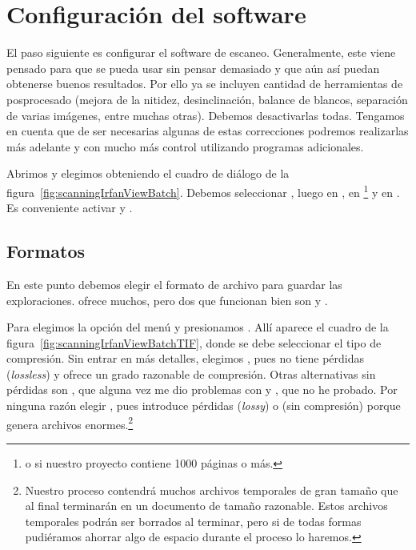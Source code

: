 \documentclass[%
	a5paper,
	10pt,
	twoside,
	openright,
	final,
]{memoir}
\begin{document}
{	\section{Configuración del software\label{sec:scanningSoftware}} El paso siguiente es configurar el software de escaneo. Generalmente, este viene pensado para que se pueda usar sin pensar demasiado y que aún así puedan obtenerse buenos resultados. Por ello ya se incluyen cantidad de herramientas de posprocesado (mejora de la nitidez, desinclinación, balance de blancos, separación de varias imágenes, entre muchas otras). Debemos desactivarlas todas. Tengamos en cuenta que de ser necesarias algunas de estas correcciones podremos realizarlas más adelante y con mucho más control utilizando programas adicionales.

	Abrimos \irfanview y elegimos  obteniendo el cuadro de diálogo de la figura~\ref{fig:scanningIrfanViewBatch}. Debemos seleccionar , luego en , en \footnote{o  si nuestro proyecto contiene 1000 páginas o más.} y en . Es conveniente activar  y .

	\subsection{Formatos\label{sec:scanningSoftwareFormats}} En este punto debemos elegir el formato de archivo para guardar las exploraciones. \irfanview ofrece muchos, pero dos que funcionan bien son \tiff y \png.

	Para \tiff elegimos la opción  del menú  y presionamos . Allí aparece el cuadro de la figura~\ref{fig:scanningIrfanViewBatchTIF}, donde se debe seleccionar el tipo de compresión. Sin entrar en más detalles, elegimos , pues no tiene pérdidas (\emph{lossless}) y ofrece un grado razonable de compresión. Otras alternativas sin pérdidas son , que alguna vez me dio problemas con \scantailor y , que no he probado. Por ninguna razón elegir , pues introduce pérdidas (\emph{lossy}) o  (sin compresión) porque genera archivos enormes.\footnote{Nuestro proceso contendrá muchos archivos temporales de gran tamaño que al final terminarán en un documento de tamaño razonable. Estos archivos temporales podrán ser borrados al terminar, pero si de todas formas pudiéramos ahorrar algo de espacio durante el proceso lo haremos.}

}
\end{document}
